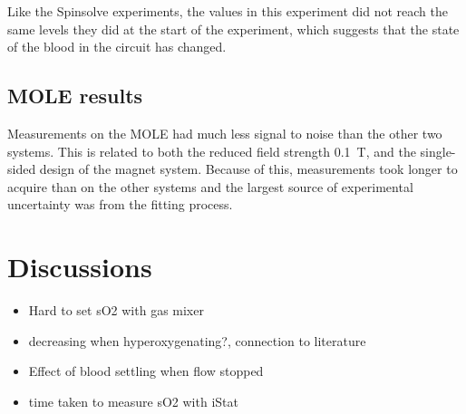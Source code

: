 Like the Spinsolve experiments, the \Ttwo values in this experiment did not reach the same levels they did at the start of the experiment, which suggests that the state of the blood in the circuit has changed.

\subsection{MOLE results}
Measurements on the MOLE had much less signal to noise than the other two systems.
This is related to both the reduced field strength \SI{0.1}{T}, and the single-sided design of the magnet system.
Because of this, measurements took longer to acquire than on the other systems and the largest source of experimental uncertainty was from the fitting process.


\section{Discussions}

\begin{itemize}
\item Hard to set sO2 with gas mixer
\item decreasing \Ttwo when hyperoxygenating?, connection to literature
\item Effect of blood settling when flow stopped
\item time taken to measure sO2 with iStat
\end{itemize}
